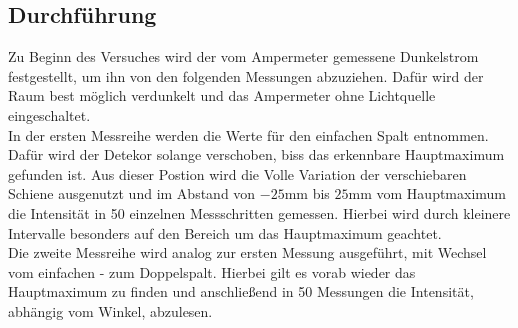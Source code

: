 \subsection{Durchführung}
Zu Beginn des Versuches wird der vom Ampermeter gemessene Dunkelstrom festgestellt, um ihn von den folgenden Messungen abzuziehen.
Dafür wird der Raum best möglich verdunkelt und das Ampermeter ohne Lichtquelle eingeschaltet.
\\ 
\newline
In der ersten Messreihe werden die Werte für den einfachen Spalt entnommen. Dafür wird der Detekor solange verschoben, biss das erkennbare Hauptmaximum 
gefunden ist. Aus dieser Postion wird die Volle Variation der verschiebaren Schiene ausgenutzt und im Abstand von $-25 \si{\mm}$ bis 
$25 \si{\mm}$ vom Hauptmaximum die Intensität in 50 einzelnen Messschritten gemessen. 
Hierbei wird durch kleinere Intervalle besonders auf den Bereich um das Hauptmaximum geachtet.
\\
\newline
Die zweite Messreihe wird analog zur ersten Messung ausgeführt, mit Wechsel vom einfachen - zum Doppelspalt.
Hierbei gilt es vorab wieder das Hauptmaximum zu finden und anschließend in 50 Messungen die Intensität, abhängig vom Winkel,
abzulesen. 